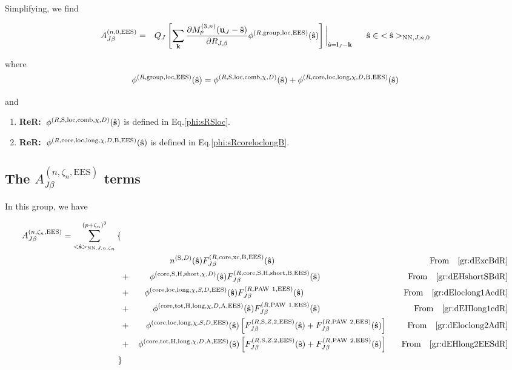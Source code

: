\documentclass[paper=a4, fontsize=11pt]{article} %
\numberwithin{equation}{section} %
\numberwithin{figure}{section} %
\numberwithin{table}{section} %
\newcommand{\p}{\partial}
\newcommand{\bu}{{\bf{u}}}
\newcommand{\bl}{{\bf{l}}}
\newcommand{\bk}{{\bf{k}}}
\newcommand{\bs}{{\bf{s}}}
\newcommand{\hs}{{\hat{\bf{s}}}}
\newcommand{\rS}{{\mathrm{S}}}
\newcommand{\rEES}{{\mathrm{EES}}}
\newcommand{\rxc}{{\mathrm{xc}}}
\newcommand{\rgr}{{\mathrm{group}}}
\newcommand{\rcore}{{\mathrm{core}}}
\newcommand{\rNN}{{\mathrm{NN}}}
\newcommand{\rshort}{{\mathrm{short}}}
\newcommand{\rlong}{{\mathrm{long}}}
\newcommand{\rP}{{\mathrm{PAW}}}
\newcommand{\rH}{{\mathrm{H}}}
\newcommand{\rA}{{\mathrm{A}}}
\newcommand{\rB}{{\mathrm{B}}}
\newcommand{\rcomb}{{\mathrm{comb}}}
\newcommand{\rlo}{{\mathrm{loc}}}
\newcommand{\rtot}{{\mathrm{tot}}}
\newcommand{\RJb}{{R_{J,\beta}}}
\newcommand{\pzn}{{(p+\zeta_n)^3}}
\newcommand{\hsJn}{{<\hs>_{\rNN,J,n,\zeta_n}}}
\newcommand{\hsJnzr}{{<\hs>_{\rNN,J,n,0}}}
\newcommand{\hsinJnzr}{{\ \ \ \ \ \hs  \in  \hsJnzr}}
\newcommand{\fr}{{\nonumber \ \ \ \ \ \mathrm{From}\ \ \ }}
\newcommand{\ReR}{{{\bf ReR:\ }}}
\begin{document}
Simplifying, we find

\begin{eqnarray}\label{gr:AJb3}
A_{J\beta}^{(n,0,\rEES)} &=& Q_J \left[ \sum_{\bk} \frac{\p M_p^{(3,n)}(\bu_{J}-\hat \bs)}{\p \RJb} \phi^{(R,\rgr,\rlo,\rEES)}(\hs)\right]\bigg|_{\hat \bs=\bl_J-\bk} \hsinJnzr 
\end{eqnarray}

where
\begin{equation}
\phi^{(R,\rgr,\rlo,\rEES)}(\hs) = \phi^{(R,\rS,\rlo,\rcomb,\chi,D)}(\hs) + \phi^{(R,\rcore,\rlo,\rlong,\chi,D,\rB,\rEES)}(\hs)
\end{equation}

and
\begin{enumerate}
\item \ReR $\phi^{(R,\rS,\rlo,\rcomb,\chi,D)}(\hs)$ is defined in Eq.\eqref{phi:sRSloc}.
\item \ReR $\phi^{(R,\rcore,\rlo,\rlong,\chi,D,\rB,\rEES)}(\hs)$ is defined in Eq.\eqref{phi:sRcoreloclongB}.
\end{enumerate}



\subsection{The $A_{J\beta}^{(n,\zeta_n,\rEES)}$ terms}

In this group, we have

\begin{eqnarray}
A_{J\beta}^{(n,\zeta_n,\rEES)} = 
 \sum_{\hsJn}^{\pzn} \left\{ \right. &&  \nonumber \\
&&\left. n^{(\rS,D)}(\hat \bs) F_{J\beta}^{(R,\rcore,\rxc,\rB,\rEES)}(\hs) \hspace*{2.3in}\fr \eqref{gr:dExcBdR} \right. \\
&+& \left.  \phi^{(\rcore,\rS,\rH,\rshort,\chi,D)}(\hs)F_{J\beta}^{(R,\rcore,\rS,\rH,\rshort,\rB,\rEES)}(\hs) \hspace*{1.2in} \fr \eqref{gr:dEHshortSBdR} \right.\\
&+& \left. \phi^{(\rcore,\rlo,\rlong,\chi,S,D,\rEES)}(\hs)  F_{J\beta}^{(R,\rP\ 1,\rEES)}(\hs) \hspace*{1.4in} \fr \eqref{gr:dEloclong1AcdR}  \right. \\
&+& \left.  \phi^{(\rcore,\rtot,\rH,\rlong,\chi,D,\rA,\rEES)}(\hs) F_{J\beta}^{(R,\rP\ 1,\rEES)}(\hs) \hspace*{1.3in}\fr \eqref{gr:dEHlong1cdR} \right.\\
&+& \left.  \phi^{(\rcore,\rlo,\rlong,\chi,S,D,\rEES)}(\hs) \left[F_{J\beta}^{(R,\rS,Z,2,\rEES)}(\hs)+ F_{J\beta}^{(R,\rP\ 2,\rEES)}(\hs)\right] \hspace*{0.1in} \fr \eqref{gr:dEloclong2AdR}\right.\\
&+& \left.  \phi^{(\rcore,\rtot,\rH,\rlong,\chi,D,\rA,\rEES)}(\hs) \left[F_{J\beta}^{(R,\rS,Z,2,\rEES)}(\hs)+ F_{J\beta}^{(R,\rP\ 2,\rEES)}(\hs)\right] \fr \eqref{gr:dEHlong2EESdR} \right. \\
\left. \right\} &&
\end{eqnarray}
\end{document}
